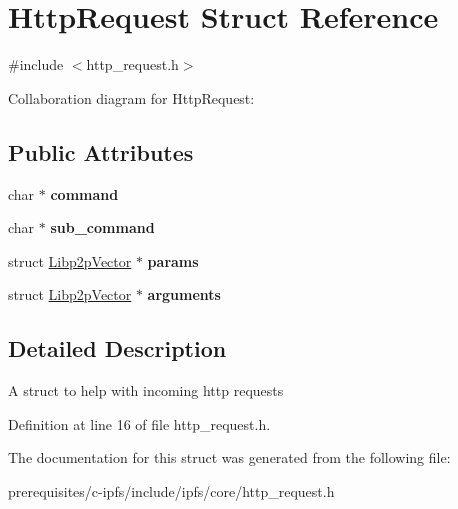 \hypertarget{struct_http_request}{}\section{Http\+Request Struct Reference}
\label{struct_http_request}


{\ttfamily \#include $<$http\+\_\+request.\+h$>$}



Collaboration diagram for Http\+Request\+:
\subsection*{Public Attributes}
\begin{DoxyCompactItemize}
\item 
\mbox{\label{struct_http_request_a60dba58262f6c78fc37d06dfb8eb342a}} 
char $\ast$ {\bfseries command}
\item 
\mbox{\label{struct_http_request_ae727742fc377f7685714ef5642e07618}} 
char $\ast$ {\bfseries sub\+\_\+command}
\item 
\mbox{\label{struct_http_request_a3460b8f866c88a332bff36f6bc14f79e}} 
struct \mbox{\hyperlink{struct_libp2p_vector}{Libp2p\+Vector}} $\ast$ {\bfseries params}
\item 
\mbox{\label{struct_http_request_a03d07d21108d369ea80a33fd655db8ad}} 
struct \mbox{\hyperlink{struct_libp2p_vector}{Libp2p\+Vector}} $\ast$ {\bfseries arguments}
\end{DoxyCompactItemize}


\subsection{Detailed Description}
A struct to help with incoming http requests 

Definition at line 16 of file http\+\_\+request.\+h.



The documentation for this struct was generated from the following file\+:\begin{DoxyCompactItemize}
\item 
prerequisites/c-\/ipfs/include/ipfs/core/http\+\_\+request.\+h\end{DoxyCompactItemize}

